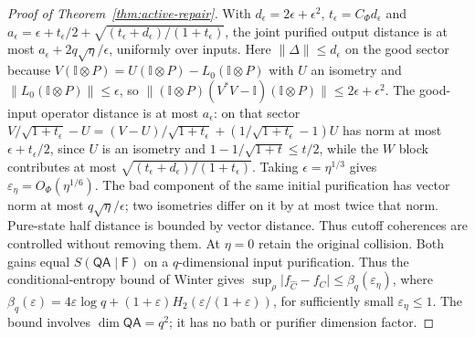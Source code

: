 \documentclass[11pt,a4paper]{article}
\numberwithin{equation}{section}
\theoremstyle{plain}
\theoremstyle{definition}
\newcommand{\rg}[1]{\mathsf{#1}}
\newcommand{\one}{\mathbb{I}}
\begin{document}
\begin{proof}[Proof of Theorem~\ref{thm:active-repair}]
With $d_\epsilon=2\epsilon+\epsilon^2$, $t_\epsilon=C_\Phi d_\epsilon$ and
$a_\epsilon=\epsilon+t_\epsilon/2+\sqrt{(t_\epsilon+d_\epsilon)/(1+t_\epsilon)}$,
the joint purified output distance is at most
$a_\epsilon+2q\sqrt{\eta}/\epsilon$, uniformly over inputs. Here
$\lVert\Delta\rVert\le d_\epsilon$ on the good sector because
$V(\one\otimes P)=U(\one\otimes P)-L_0(\one\otimes P)$ with $U$ an isometry
and $\lVert L_0(\one\otimes P)\rVert\le\epsilon$, so
$\lVert(\one\otimes P)(V^*V-\one)(\one\otimes P)\rVert\le 2\epsilon+\epsilon^2$.
The good-input operator distance is at most $a_\epsilon$: on that sector
$V/\sqrt{1+t_\epsilon}-U=(V-U)/\sqrt{1+t_\epsilon}+(1/\sqrt{1+t_\epsilon}-1)U$
has norm at most $\epsilon+t_\epsilon/2$, since $U$ is an isometry and
$1-1/\sqrt{1+t}\le t/2$, while the $W$ block contributes at most
$\sqrt{(t_\epsilon+d_\epsilon)/(1+t_\epsilon)}$. Taking
$\epsilon=\eta^{1/3}$ gives $\varepsilon_\eta=O_\Phi(\eta^{1/6})$. The bad
component of the same initial purification has vector norm at most
$q\sqrt{\eta}/\epsilon$; two isometries differ on it by at most twice that
norm. Pure-state half
distance is bounded by vector distance. Thus cutoff coherences are controlled
without removing them. At $\eta=0$ retain the original collision. Both gains
equal $S(\rg{Q}\rg{A}\mid\rg{F})$ on a $q$-dimensional input purification.
Thus the conditional-entropy bound of Winter \cite[Lemma 2]{Winter2016} gives
$\sup_\rho\lvert f_{\hat C}-f_C\rvert\le\beta_q(\varepsilon_\eta)$, where
$\beta_q(\varepsilon)=4\varepsilon\log q+(1+\varepsilon)
H_2(\varepsilon/(1+\varepsilon))$, for sufficiently small
$\varepsilon_\eta\le 1$. The bound involves $\dim\rg{Q}\rg{A}=q^2$; it has no
bath or purifier dimension factor.


\end{proof}
\end{document}
